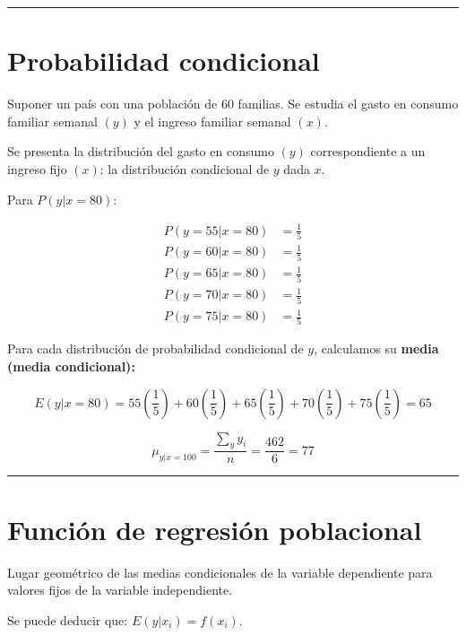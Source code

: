 \documentclass[
]{book}
\begin{document}
\begin{center}\rule{0.5\linewidth}{0.5pt}\end{center}

\hypertarget{probabilidad-condicional}{%
\section{Probabilidad condicional}\label{probabilidad-condicional}}

Suponer un país con una población de 60 familias. Se estudia el gasto en consumo familiar semanal \((y)\) y el ingreso familiar semanal \((x)\).

Se presenta la distribución del gasto en consumo \((y)\) correspondiente a un ingreso fijo \((x)\): la distribución condicional de \(y\) dada \(x\).

Para \(P(y|x = 80)\):

\[ 
\begin{aligned} 
P(y=55|x=80) &= \frac{1}{5} \\ 
P(y=60|x=80) &= \frac{1}{5} \\ 
P(y=65|x=80) &= \frac{1}{5} \\ 
P(y=70|x=80) &= \frac{1}{5} \\ 
P(y=75|x=80) &= \frac{1}{5} 
\end{aligned} 
\]

Para cada distribución de probabilidad condicional de \(y\), calculamos su \textbf{media (media condicional):}

\[ 
E(y|x=80) = 55\left( \frac{1}{5} \right) + 60\left( \frac{1}{5} \right) + 65\left( \frac{1}{5} \right) + 70\left( \frac{1}{5} \right) + 75\left( \frac{1}{5} \right) = 65
\]

\[
\mu_{y|x=100} = \frac{\sum_{y}y_{i}}{n} = \frac{462}{6} = 77
\]

\begin{center}\rule{0.5\linewidth}{0.5pt}\end{center}

\hypertarget{funciuxf3n-de-regresiuxf3n-poblacional}{%
\section{Función de regresión poblacional}\label{funciuxf3n-de-regresiuxf3n-poblacional}}

Lugar geométrico de las medias condicionales de la variable dependiente para valores fijos de la variable independiente.

Se puede deducir que: \(E(y|x_i) = f(x_i)\).
\end{document}
